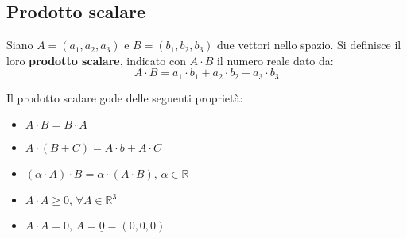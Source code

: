 \documentclass[a4paper,12pt, oneside]{book}
\begin{document}
\subsection{Prodotto scalare}
\begin{definizione}
Siano $A=(a_1,a_2,a_3)$ e $B=(b_1,b_2,b_3)$ due vettori nello spazio. Si definisce il loro \textbf{prodotto scalare}, indicato con $A\cdot B$ il numero reale dato da:
$$A\cdot B=a_1\cdot b_1+a_2\cdot b_2+a_3\cdot b_3$$
\end{definizione}
Il prodotto scalare gode delle seguenti proprietà:
\begin{itemize}
\item $A\cdot B=B\cdot A$
\item $A\cdot (B+C)=A\cdot b+A\cdot C$
\item $(	\alpha\cdot A)\cdot B=\alpha\cdot (A\cdot B),\, \alpha\in\mathbb{R}$
\item $A\cdot A\geq 0,\,\forall A\in\mathbb{R}^3$
\item $A\cdot A= 0,\,A=\underline{0}=(0,0,0)$

\end{itemize}
\end{document}
